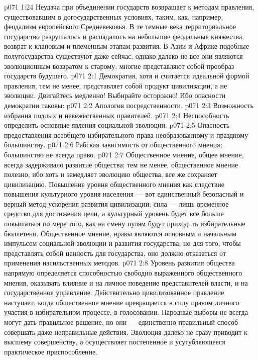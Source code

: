 \vs p071 1:24 Неудача при объединении государств возвращает к методам правления, существовавшим в догосударственных условиях, таким, как, например, феодализм европейского Средневековья. В те темные века территориальное государство разрушалось и распадалось на небольшие феодальные княжества, возврат к клановым и племенным этапам развития. В Азии и Африке подобные полугосударства существуют даже сейчас, однако далеко не все они являются эволюционным возвратом к старому; многие представляют собой прообраз государств будущего.
\vs p071 2:1 Демократия, хотя и считается идеальной формой правления, тем не менее, представляет собой продукт цивилизации, а не эволюции. Двигайтесь медленно! Выбирайте осторожно! Ибо опасности демократии таковы:
\vs p071 2:2 \bibnobreakspace Апология посредственности.
\vs p071 2:3 \bibnobreakspace Возможность избрания подлых и невежественных правителей.
\vs p071 2:4 \bibnobreakspace Неспособность определить основные явления социальной эволюции.
\vs p071 2:5 \bibnobreakspace Опасность предоставления всеобщего избирательного права необразованному и праздному большинству.
\vs p071 2:6 \bibnobreakspace Рабская зависимость от общественного мнения; большинство не всегда право.
\vs p071 2:7 \pc Общественное мнение, общее мнение, всегда задерживало развитие общества; тем не менее, общественное мнение полезно, ибо хоть и замедляет эволюцию общества, все же сохраняет цивилизацию. Повышение уровня общественного мнения как следствие повышения культурного уровня населения --- вот единственный безопасный и верный метод ускорения развития цивилизации; сила --- лишь временное средство для достижения цели, а культурный уровень будет все больше повышаться по мере того, как на смену пулям будут приходить избирательные бюллетени. Общественное мнение, нравы являются основным и начальным импульсом социальной эволюции и развития государства, но для того, чтобы представлять собой ценность для государства, оно должно отказаться от применения насильственных методов.
\vs p071 2:8 Уровень развития общества напрямую определяется способностью свободно выраженного общественного мнения, оказывать влияние и на личное поведение представителей власти, и на государственное управление. Действительно цивилизованное правление наступает, когда общественное мнение превращается в силу правом личного участия в избирательном процессе, в голосовании. Народные выборы не всегда могут дать правильное решение, но они --- единственно правильный способ совершать даже неправильные действия. Эволюция далеко не сразу приводит к высшему совершенству, а осуществляет постепенное и усугубляющееся практическое приспособление.
